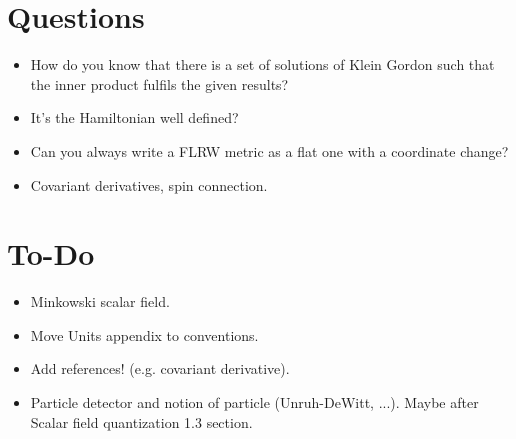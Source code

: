 \section{Questions}
\begin{itemize}
	\item How do you know that there is a set of solutions of Klein Gordon such that the inner product fulfils the given results?
	\item It's the Hamiltonian well defined?
	\item Can you always write a FLRW metric as a flat one with a coordinate change?
	\item Covariant derivatives, spin connection.
\end{itemize}
\section{To-Do}
\begin{itemize}
	\item Minkowski scalar field.
	\item Move Units appendix to conventions.
	\item Add references! (e.g. covariant derivative).
	\item Particle detector and notion of particle (Unruh-DeWitt, ...). Maybe after Scalar field quantization 1.3 section.
\end{itemize}